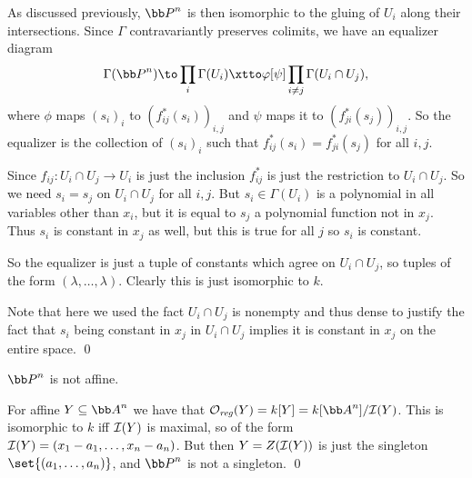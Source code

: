     As discussed previously, $\bP^n$ is then isomorphic to the gluing of $U_i$ along their intersections.
    Since $\Gamma$ contravariantly preserves colimits, we have an equalizer diagram
    $$ \Gamma(\bP^n) \to \prod_i\Gamma(U_i) \xtto\phi[\psi] \prod_{i\neq j}\Gamma(U_i\cap U_j) , $$
    where $\phi$ maps $(s_i)_i$ to $(f_{ij}^*(s_i))_{i,j}$ and $\psi$ maps it to $(f_{ji}^*(s_j))_{i,j}$.
    So the equalizer is the collection of $(s_i)_i$ such that $f_{ij}^*(s_i)=f_{ji}^*(s_j)$ for all $i,j$.

    Since $f_{ij}\colon U_i\cap U_j\to U_i$ is just the inclusion $f_{ij}^*$ is just the restriction to $U_i\cap U_j$.
    So we need $s_i=s_j$ on $U_i\cap U_j$ for all $i,j$.
    But $s_i\in\Gamma(U_i)$ is a polynomial in all variables other than $x_i$, but it is equal to $s_j$ a polynomial function not in $x_j$.
    Thus $s_i$ is constant in $x_j$ as well, but this is true for all $j$ so $s_i$ is constant.

    So the equalizer is just a tuple of constants which agree on $U_i\cap U_j$, so tuples of the form $(\lambda,\dots,\lambda)$.
    Clearly this is just isomorphic to $k$.

    Note that here we used the fact $U_i\cap U_j$ is nonempty and thus dense to justify the fact that $s_i$ being constant in $x_j$ in $U_i\cap U_j$ implies it is constant in $x_j$ on the entire space.
    \qed

\eproof

\bcoro

    $\bP^n$ is not affine.

\ecoro

\bproof

    For affine $Y\subseteq\bA^n$ we have that $\O_\reg(Y)=k[Y]=k[\bA^n]/\I(Y)$.
    This is isomorphic to $k$ iff ${{\cal I}}(Y)$ is maximal, so of the form ${{\cal I}}(Y)=(x_1-a_1,\dots,x_n-a_n)$.
    But then $Y=Z({{\cal I}}(Y))$ is just the singleton $\set{(a_1,\dots,a_n)}$, and $\bP^n$ is not a singleton.
    \qed

\eproof
